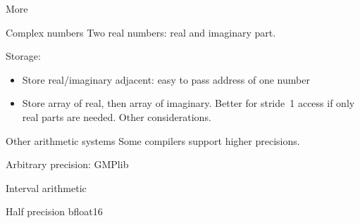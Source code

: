  {More}

\begin{numberedframe}{Complex numbers}
Two real numbers: real and imaginary part.

Storage:
\begin{itemize}
\item Store real/imaginary adjacent: easy to pass address of one
  number
\item Store array of real, then array of imaginary. Better for
  stride~1 access if only real parts are needed. Other considerations.
\end{itemize}
\end{numberedframe}

\begin{numberedframe}{Other arithmetic systems}
Some compilers support higher precisions.

Arbitrary precision: GMPlib

Interval arithmetic

Half precision bfloat16
\end{numberedframe}



